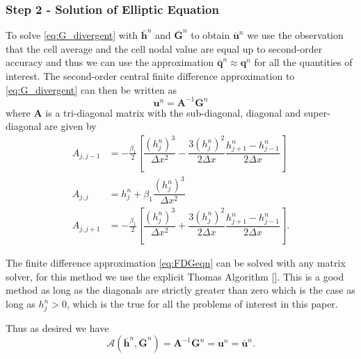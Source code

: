 \documentclass[10pt]{elsarticle}
\newcommand{\vecn}[1]{\boldsymbol{#1}}
\begin{document}
\subsubsection{Step 2 - Solution of Elliptic Equation}
To solve \eqref{eq:G_divergent} with $\bar{\vecn{h}}^n$ and $\bar{\vecn{G}}^n$ to obtain $\bar{\vecn{u}}^n$ we use the observation that the cell average and the cell nodal value are equal up to second-order accuracy and thus we can use the approximation $\bar{\vecn{q}}^n \approx {\vecn{q}}^n$ for all the quantities of interest. The second-order central finite difference approximation to \eqref{eq:G_divergent} can then be written as
\begin{equation}
{\vecn{u}}^n = \vecn{A}^{-1} {\vecn{G}}^n
\label{eq:FDGeqn}
\end{equation}
where $\vecn{A}$ is a tri-diagonal matrix with the sub-diagonal, diagonal and super-diagonal are given by
\begin{align*}
A_{j,j-1} &=  -\frac{\beta_1}{2}  \left[  \dfrac{\left(h_j^n\right)^3}{\Delta x^2} -  \dfrac{3\left(h_j^n\right)^2}{2\Delta x} \dfrac{h_{j+1}^n - h_{j-1}^n}{2\Delta x}\right] \\
A_{j,j} &= h^n_j + \beta_1\dfrac{\left(h_j^n\right)^3}{\Delta x^2} \\
A_{j,j+1} &=  -\frac{\beta_1}{2}  \left[  \dfrac{\left(h_j^n\right)^3}{\Delta x^2} +  \dfrac{3\left(h_j^n\right)^2}{2\Delta x} \dfrac{h_{j+1}^n - h_{j-1}^n}{2\Delta x}\right] . 
\end{align*}

The finite difference approximation \eqref{eq:FDGeqn} can be solved with any matrix solver, for this method we use the explicit Thomas Algorithm []. This is a good method as long as the diagonals are strictly greater than zero which is the case as long as $h_{j}^n > 0$, which is the true for all the problems of interest in this paper. 

Thus as desired we have 
\begin{equation}
\mathcal{A}\left(\bar{\vecn{h}}^n,\bar{\vecn{G}}^n\right) = \vecn{A}^{-1} {\vecn{G}}^n = \vecn{u}^n = \bar{{\vecn{u}}}^n. 
\label{eq:A_secondord}
\end{equation}
\end{document}
